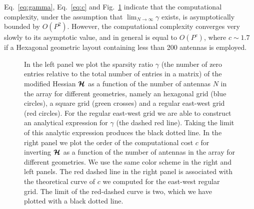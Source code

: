 \documentclass[useAMS,usenatbib]{mn2e}
\newcommand{\bmH}{\bmath{\mathcal{H}}}
\begin{document}
Eq.~\eqref{eq:gamma}, Eq.~\eqref{eq:c} and Fig.~\ref{fig:sparsity} indicate that the computational complexity, under the assumption that $\lim_{N\rightarrow \infty} \gamma$ exists, is asymptotically bounded by $O(P^2)$.
However, the computational complexity converges very slowly to its asymptotic value, and in general is equal to $O(P^{c})$, where $c \sim 1.7$ if a Hexagonal geometric layout containing less than 200 antennas is employed.

\begin{figure}
\centering
{}
\caption{In the left panel we plot the sparsity ratio $\gamma$ (the number of zero entries relative to the total number of entries in a matrix) of the modified Hessian $\bmH$ as a function of the number 
of antennas $N$ in the array for different geometries, namely an hexagonal grid (blue circles), a square grid (green crosses) and a regular east-west grid (red circles). For the regular east-west grid we are able to construct an analytical expression for $\gamma$ (the dashed red line). Taking the limit 
of this analytic expression produces the black dotted line. In the right panel we plot the order of the computational cost $c$ for inverting $\bmH$ as a function of the number 
of antennas in the array for different geometries. We use the same color scheme in the right and left panels. The red dashed line 
in the right panel is associated with the theoretical curve of $c$ we computed for the east-west regular grid. The limit of the red-dashed curve is two, which we 
have plotted with a black dotted line.
\label{fig:sparsity}} 
\end{figure}
\end{document}
